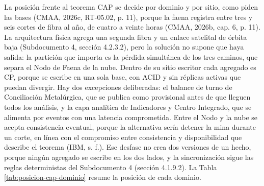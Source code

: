 \documentclass[subdoc]{../../comun/overfore}
\begin{document}
La posición frente al teorema CAP se decide por dominio y por sitio, como piden las bases (CMAA, 2026c, RT-05.02, p. 11), porque la faena registra entre tres y seis cortes de fibra al año, de cuatro a veinte horas (CMAA, 2026b, cap. 6, p. 11). La arquitectura física agrega una segunda fibra y un enlace satelital de órbita baja (Subdocumento 4, sección 4.2.3.2), pero la solución no supone que haya salida: la partición que importa es la pérdida simultánea de los tres caminos, que separa el Nodo de Faena de la nube. Dentro de su sitio escritor cada agregado es CP, porque se escribe en una sola base, con ACID y sin réplicas activas que puedan divergir. Hay dos excepciones deliberadas: el balance de turno de Conciliación Metalúrgica, que se publica como provisional antes de que lleguen todos los análisis, y la capa analítica de Indicadores y Centro Integrado, que se alimenta por eventos con una latencia comprometida. Entre el Nodo y la nube se acepta consistencia eventual, porque la alternativa sería detener la mina durante un corte, en línea con el compromiso entre consistencia y disponibilidad que describe el teorema (IBM, s. f.). Ese desfase no crea dos versiones de un hecho, porque ningún agregado se escribe en los dos lados, y la sincronización sigue las reglas deterministas del Subdocumento 4 (sección 4.1.9.2). La Tabla \ref{tab:posicion-cap-dominio} resume la posición de cada dominio.
\end{document}
